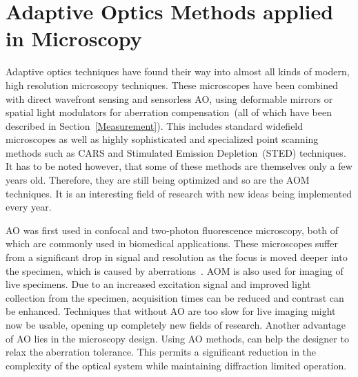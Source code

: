 
\section{Adaptive Optics Methods applied in Microscopy}
\label{sec:ExperimentDiscussion}

Adaptive optics techniques have found their way into almost all kinds of modern, high resolution microscopy techniques. These microscopes have been combined with direct wavefront sensing and sensorless AO, using deformable mirrors or spatial light modulators for aberration compensation~(all of which have been described in Section~\ref{Measurement}). This includes standard widefield microscopes as well as highly sophisticated and specialized point scanning methods such as CARS and Stimulated Emission Depletion~(STED) techniques. It has to be noted however, that some of these methods are themselves only a few years old. Therefore, they are still being optimized and so are the AOM techniques. It is an interesting field of research with new ideas being implemented every year.

AO was first used in confocal and two-photon fluorescence microscopy, both of which are commonly used in biomedical applications. These microscopes suffer from a significant drop in signal and resolution as the focus is moved deeper into the specimen, which is caused by aberrations~\cite{characterizing_abberations}. AOM is also used for imaging of live specimens. Due to an increased excitation signal and improved light collection from the specimen, acquisition times can be reduced and contrast can be enhanced. Techniques that without AO are too slow for live imaging might now be usable, opening up completely new fields of research. Another advantage of AO lies in the microscopy design. Using AO methods, can help the designer to relax the aberration tolerance. This permits a significant reduction in the complexity of the optical system while maintaining diffraction limited operation.

